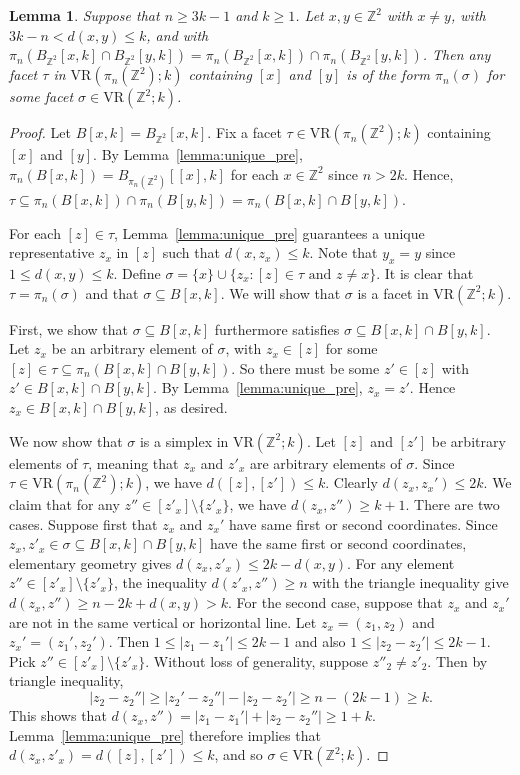 \documentclass[12pt,a4paper]{amsart}
\newtheorem{lemma}[theorem]{Lemma}
\theoremstyle{definition}
\newcommand{\Z}{\ensuremath{\mathbb{Z}}}
\newcommand{\vr}[2]{\mathrm{VR}(#1;#2)}
\numberwithin{equation}{section}
\begin{document}
\begin{lemma}
\label{lemma:prefacets}
Suppose that $n\geq 3k-1$ and $k\geq 1$.
Let $x,y\in\Z^2$ with $x\neq y$, with $3k-n< d(x,y)\leq k$, and with $\pi_n(B_{\Z^2}[x, k]\cap B_{\Z^2}[y, k]) =\pi_n(B_{\Z^2}[x, k])\cap \pi_n(B_{\Z^2}[y, k])$.
Then any facet $\tau$ in $\vr{\pi_n(\Z^2)}{k}$ containing $[x]$ and $[y]$ is of the form $\pi_n(\sigma)$ for some facet $\sigma\in \vr{\Z^2}{k}$.
\end{lemma}

\begin{proof}
Let $B[x,k]=B_{\Z^2}[x,k]$.
Fix a facet $\tau\in\vr{\pi_n(\Z^2)}{k}$ containing $[x]$ and $[y]$.
By Lemma~\ref{lemma:unique_pre}, $\pi_n(B[x, k])=B_{\pi_n(\Z^2)}[[x], k]$ for each $x\in \Z^2$ since $n>2k$.
Hence, $\tau\subseteq\pi_n(B[x, k])\cap \pi_n(B[y, k])=\pi_n(B[x, k]\cap B[y, k])$.

For each $[z]\in \tau$, Lemma~\ref{lemma:unique_pre} guarantees a unique representative $z_x$ in $[z]$ such that $d(x, z_x)\leq k$.
Note that $y_x=y$ since $1\leq d(x,y)\leq k$.
Define $\sigma=\{x\}\cup \{z_x: [z]\in \tau \text{ and } z\neq x\}$.
It is clear that $\tau=\pi_n(\sigma)$ and that $\sigma\subseteq B[x,k]$.
We will show that $\sigma$ is a facet in $\vr{\Z^2}{k}$.

First, we show that $\sigma\subseteq B[x,k]$ furthermore satisfies $\sigma\subseteq B[x, k]\cap B[y, k]$.
Let $z_x$ be an arbitrary element of $\sigma$, with $z_x\in [z]$ for some $[z]\in \tau \subseteq \pi_n(B[x, k]\cap B[y, k])$.
So there must be some $z'\in [z]$ with $z'\in B[x, k]\cap B[y, k]$. By Lemma~\ref{lemma:unique_pre}, $z_x=z'$.
Hence $z_x\in B[x, k]\cap B[y, k]$, as desired.

We now show that $\sigma$ is a simplex in $\vr{\Z^2}{k}$.
Let $[z]$ and $[z']$ be arbitrary elements of $\tau$, meaning that $z_x$ and $z'_x$ are arbitrary elements of $\sigma$.
Since $\tau\in\vr{\pi_n(\Z^2)}{k}$, we have $d([z], [z'])\leq k$.
Clearly $d(z_x, z_x')\leq 2k$. 
We claim that for any $z''\in[z'_x]\setminus\{z'_x\}$, we have $d(z_x,z'')\ge k+1$.
There are two cases.
Suppose first that $z_x$ and $z_x'$ have same first or second coordinates.
Since $z_x, z'_x\in\sigma \subseteq B[x, k]\cap B[y, k]$ have the same first or second coordinates, elementary geometry gives $d(z_x, z'_x)\leq 2k-d(x,y)$.
For any element $z''\in [z'_x]\setminus\{z'_x\}$, the inequality $d(z'_x, z'')\geq n$ with the triangle inequality give $d(z_x, z'')\geq n-2k+d(x,y)>k$.
For the second case, suppose that $z_x$ and $z_x'$ are not in the same vertical or horizontal line. Let  $z_x=(z_1, z_2)$ and $z_x'=(z_1', z_2')$.
Then $1\leq |z_1-z_1'|\leq 2k-1$ and also $1\leq |z_2-z_2'|\leq  2k-1$.
Pick $z''\in [z'_x]\setminus\{z'_x\}$. Without loss of generality, suppose $z''_2\neq z'_2$.
Then by triangle inequality,  \[|z_2-z_2''|\geq |z_2'-z_2''|-|z_2-z_2'|\geq n-(2k-1)\geq k.\] 
This shows that $d(z_x, z'')= |z_1-z_1'|+|z_2-z_2''|\geq 1+k$.
Lemma~\ref{lemma:unique_pre} therefore implies that $d(z_x, z'_x)= d([z], [z'])\le k$, and so $\sigma \in \vr{\Z^2}{k}$.


\end{proof}
\end{document}

